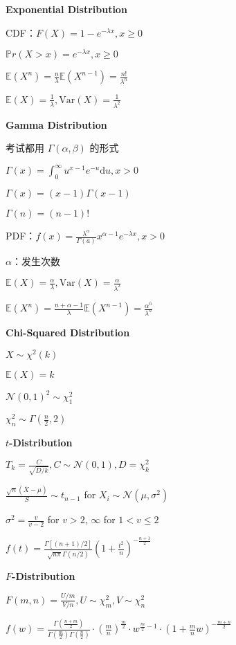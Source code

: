\documentclass[9pt,landscape]{article}
\begin{document}
\begin{multicols}{3}
\textbf{Exponential Distribution}

CDF：$F(X)=1-e^{-\lambda x}, x\ge 0$

$\mathbb{P}r(X>x)=e^{-\lambda x}, x\ge 0$

$\mathbb{E}(X^n)=\frac{n}{\lambda}\mathbb{E}(X^{n-1})=\frac{n!}{\lambda^n}$

$\mathbb{E}(X)=\frac{1}{\lambda}, \mathrm{Var}(X)=\frac{1}{\lambda^2}$

\textbf{Gamma Distribution}

考试都用 $\Gamma(\alpha, \beta)$ 的形式

$\Gamma(x)=\int_{0}^{\infty}u^{x-1}e^{-u}\mathrm{d}u, x>0$

$\Gamma(x)=(x-1)\Gamma(x - 1)$

$\Gamma(n)=(n-1)!$

PDF：$f(x)=\frac{\lambda^\alpha}{\Gamma(a)}x^{\alpha - 1}e^{-\lambda x}, x>0$

$\alpha$：发生次数

$\mathbb{E}(X)=\frac{\alpha}{\lambda}, \mathrm{Var}(X)=\frac{\alpha}{\lambda^2}$

$\mathbb{E}(X^n)=\frac{n+\alpha-1}{\lambda}\mathbb{E}(X^{n-1})=\frac{\alpha^{\overline{n}}}{\lambda^n}$

\textbf{Chi-Squared Distribution}

$X\sim \chi^2(k)$

$\mathbb{E}(X)=k$

$\mathcal{N}(0, 1)^2\sim \chi^2_1$

$\chi^2_n\sim \Gamma\left(\frac{n}{2}, 2\right)$

\textbf{$t$-Distribution}

$T_k = \frac{C}{\sqrt{D/k}}, C\sim\mathcal{N}(0, 1), D = \chi^2_k$

$\frac{\sqrt{n}(\overline{X}-\mu)}{S}\sim t_{n-1}$ for $X_i\sim \mathcal{N}(\mu, \sigma^2)$

$\sigma^2=\frac{v}{v-2}$ for $v>2$, $\infty$ for $1<v\le 2$

$f(t)=\frac{\Gamma[(n + 1) / 2]}{\sqrt{n\pi}\Gamma(n/2)}\left(1 + \frac{t^2}{n}\right)^{-\frac{n + 1}{2}}$

\textbf{$F$-Distribution}

$F(m, n) = \frac{U/m}{V/n}, U\sim\chi_m^2, V\sim \chi_n^2$

$f(w)=\frac{\Gamma\left(\frac{n+m}{2}\right)}{\Gamma\left(\frac{m}{2}\right)\Gamma\left(\frac{n}{2}\right)}\cdot\left(\frac{m}{n}\right)^{\frac{m}{2}}\cdot w^{\frac{m}{2}-1}\cdot\left(1+\frac{m}{n}w\right)^{-\frac{m+n}{2}}$


\end{multicols}
\end{document}
